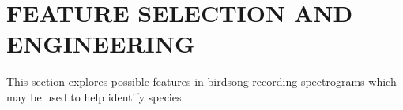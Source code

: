 \chapter{FEATURE SELECTION AND ENGINEERING}

This section explores possible features in birdsong recording spectrograms which
may be used to help identify species.
